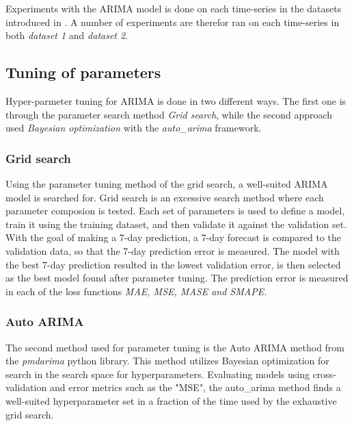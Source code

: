   Experiments with the ARIMA model is done on each time-series in the datasets introduced in .
  A number of experiments are therefor ran on each time-series in both \textit{dataset 1} and \textit{dataset 2}.


  \iffalse
    ARIMA models are first tuned on each time-series in order to make predicitons.
    The hyper-parmeters fond after the tuning is then used in order to created models capable of making predictions.
    The model attempts to make a 7 day ahead prediction.
  \fi

  \subsection{Tuning of parameters}
  Hyper-parmeter tuning for ARIMA is done in two different ways.
  The first one is through the parameter search method \textit{Grid search},
  while the second approach used \textit{Bayesian optimization} with the \textit{auto\_arima} framework.

  \subsubsection*{Grid search}
  Using the parameter tuning method of the grid search, a well-suited ARIMA model is searched for.
  Grid search is an excessive search method where each parameter composion is tested.
  Each set of parameters is used to define a model, train it using the training dataset,
  and then validate it against the validation set.
  With the goal of making a 7-day prediction, a 7-day forecast is compared to the validation data,
  so that the 7-day prediction error is measured.
  The model with the best 7-day prediction resulted in the lowest validation error,
  is then selected as the best model found after parameter tuning.
  The prediction error is measured in each of the loss functions \textit{MAE, MSE, MASE and SMAPE}.

  \subsubsection{Auto ARIMA}
  The second method used for parameter tuning is the Auto ARIMA method from the \textit{pmdarima} python library.
  This method utilizes Bayesian optimization for search in the search space for hyperparameters.
  Evaluating models using cross-validation and error metrics such as the "MSE",
  the auto\_arima method finds a well-suited hyperparameter set in a fraction of the time used by the exhaustive grid search.

